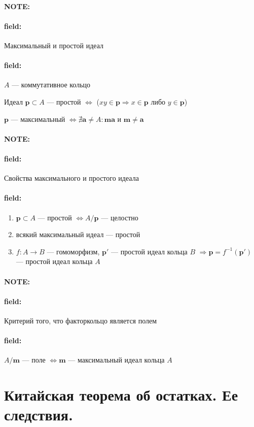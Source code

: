 \documentclass[12pt]{article}
\newenvironment{note}{\paragraph{NOTE:}}{}
\newenvironment{field}{\paragraph{field:}}{}
\begin{document}
\begin{note}
  \begin{field}
    Максимальный и простой идеал
  \end{field}
  \begin{field}
    $A$ --- коммутативное кольцо

    Идеал $\mathbf{p} \subset A$ --- простой
    $\Leftrightarrow$ ($xy \in \mathbf{p} \Rightarrow x \in \mathbf{p}$ либо $y \in \mathbf{p}$)

    $\mathbf{p}$ --- максимальный $\Leftrightarrow \nexists \mathbf{a} \neq A : \mathbf{m} \mathbf{a}$ и $\mathbf{m} \neq \mathbf{a}$
  \end{field}
\end{note}

\begin{note}
  \begin{field}
    Свойства максимального и простого идеала
  \end{field}
  \begin{field}
    \begin{enumerate}
      \item
            $\mathbf{p} \subset A$ --- простой
            $\Leftrightarrow A/\mathbf{p}$ --- целостно
      \item
            всякий максимальный идеал --- простой
      \item
            $f : A \rightarrow B$ --- гомоморфизм,
            $\mathbf{p'}$ --- простой идеал кольца $B$
            $\Rightarrow \mathbf{p} = f^{-1}(\mathbf{p'})$ ---
            простой идеал кольца $A$
    \end{enumerate}
  \end{field}
\end{note}

\begin{note}
  \begin{field}
    Критерий того, что факторкольцо является полем
  \end{field}
  \begin{field}
    $A/\mathbf{m}$ --- поле
    $\Leftrightarrow \mathbf{m}$ --- максимальный идеал
    кольца $A$
  \end{field}
\end{note}

\section{Китайская теорема об остатках. Ее следствия.}
\end{document}
